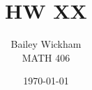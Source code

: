 \documentclass{article}
\title{HW XX}
\author{Bailey Wickham \\ MATH 406}
\date\today
\newenvironment{homeworkProblem}[1]{
    \section*{Problem #1}
}
\begin{document}
\maketitle

\begin{homeworkProblem}{1}

\end{homeworkProblem}
\begin{proof}

\end{proof}
\end{document}
